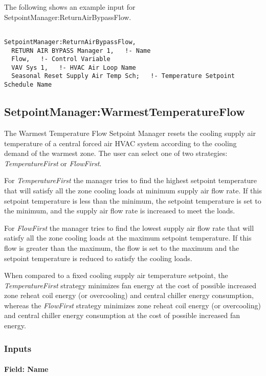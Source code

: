 The following shows an example input for SetpointManager:ReturnAirBypassFlow.

\begin{lstlisting}

SetpointManager:ReturnAirBypassFlow,
  RETURN AIR BYPASS Manager 1,   !- Name
  Flow,   !- Control Variable
  VAV Sys 1,   !- HVAC Air Loop Name
  Seasonal Reset Supply Air Temp Sch;   !- Temperature Setpoint Schedule Name
\end{lstlisting}

\subsection{SetpointManager:WarmestTemperatureFlow}\label{setpointmanagerwarmesttemperatureflow}

The Warmest Temperature Flow Setpoint Manager resets the cooling supply air temperature of a central forced air HVAC system according to the cooling demand of the warmest zone. The user can select one of two strategies: \emph{TemperatureFirst} or \emph{FlowFirst}.

For \emph{TemperatureFirst} the manager tries to find the highest setpoint temperature that will satisfy all the zone cooling loads at minimum supply air flow rate. If this setpoint temperature is less than the minimum, the setpoint temperature is set to the minimum, and the supply air flow rate is increased to meet the loads.

For \emph{FlowFirst} the manager tries to find the lowest supply air flow rate that will satisfy all the zone cooling loads at the maximum setpoint temperature. If this flow is greater than the maximum, the flow is set to the maximum and the setpoint temperature is reduced to satisfy the cooling loads.

When compared to a fixed cooling supply air temperature setpoint, the \emph{TemperatureFirst} strategy minimizes fan energy at the cost of possible increased zone reheat coil energy (or overcooling) and central chiller energy consumption, whereas the \emph{FlowFirst} strategy minimizes zone reheat coil energy (or overcooling) and central chiller energy consumption at the cost of possible increased fan energy.

\subsubsection{Inputs}\label{inputs-13-013}

\paragraph{Field: Name}\label{field-name-13-009}

